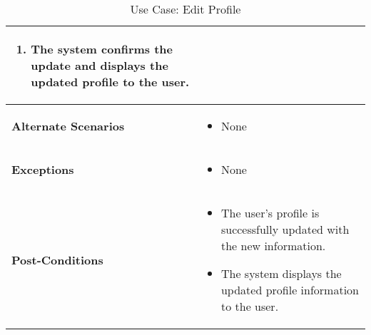\begin{table}[!ht]
\begin{tabularx}{\textwidth}{|l|X|}
\begin{enumerate}[label=\arabic*.,itemsep=0pt]
            \item The system confirms the update and displays the updated profile to the user.
        \end{enumerate} \\
        \hline
        \textbf{Alternate Scenarios} & 
        \begin{itemize}[label=--,itemsep=0pt]
            \item None
        \end{itemize} \\
        \hline
        \textbf{Exceptions} & 
        \begin{itemize}[label=--,itemsep=0pt]
            \item None
        \end{itemize} \\
        \hline
        \textbf{Post-Conditions} & 
        \begin{itemize}[label=--,itemsep=0pt]
            \item The user's profile is successfully updated with the new information.
            \item The system displays the updated profile information to the user.
        \end{itemize} \\
        \hline
    \end{tabularx}
    \caption{Use Case: Edit Profile}
    \label{tab:use-case-edit-profile}
\end{table}


